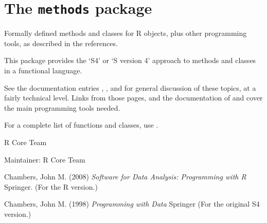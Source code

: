 
\chapter{The \texttt{methods} package}
%
\begin{Description}\relax
Formally defined methods and classes for R objects, plus
other programming tools, as described in the references.
\end{Description}
%
\begin{Details}\relax
This package provides the `S4' or `S version 4' 
approach to methods and classes in a functional language.

See the documentation entries ,
, and  for general discussion of these topics, at a
fairly technical level.  Links from those pages, and the
documentation of  and 
cover the main programming tools needed.

For a complete
list of functions and classes, use .
\end{Details}
%
\begin{Author}\relax
R Core Team

Maintainer: R Core Team 
\end{Author}
%
\begin{References}\relax
Chambers, John M. (2008)
\emph{Software for Data Analysis: Programming with R}
Springer.  (For the R version.)

Chambers, John M. (1998)
\emph{Programming with Data}
Springer (For the original S4 version.) 
\end{References}
%
